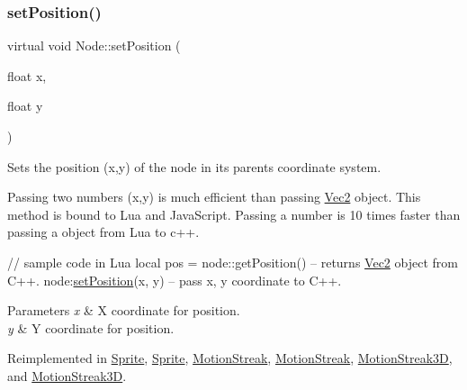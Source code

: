 \mbox{\label{classNode_aa23be53d56922c9ee20ff63ec296a1f7}} 
\subsubsection{\texorpdfstring{set\+Position()}{setPosition()}\hspace{0.1cm}{\footnotesize\ttfamily [4/4]}}
{\footnotesize\ttfamily virtual void Node\+::set\+Position (\begin{DoxyParamCaption}\item[{float}]{x,  }\item[{float}]{y }\end{DoxyParamCaption})\hspace{0.3cm}{\ttfamily [virtual]}}

Sets the position (x,y) of the node in its parent\textquotesingle{}s coordinate system.

Passing two numbers (x,y) is much efficient than passing \hyperlink{classVec2}{Vec2} object. This method is bound to Lua and Java\+Script. Passing a number is 10 times faster than passing a object from Lua to c++.


\begin{DoxyCode}
\textcolor{comment}{// sample code in Lua}
local pos  = node::getPosition()  -- returns \hyperlink{classVec2}{Vec2} \textcolor{keywordtype}{object} from C++.
node:\hyperlink{classNode_a8ffbf25763ef5f15eeae7227779505bc}{setPosition}(x, y)            -- pass x, y coordinate to C++.
\end{DoxyCode}



\begin{DoxyParams}{Parameters}
{\em x} & X coordinate for position. \\
\hline
{\em y} & Y coordinate for position. \\
\hline
\end{DoxyParams}


Reimplemented in \hyperlink{classSprite_aaef708324799384499b67c1721ad36d1}{Sprite}, \hyperlink{classSprite_ad6ceb4be9c4664798908bb0f8dd3bf70}{Sprite}, \hyperlink{classMotionStreak_a5aee78ffa74f687a09d9167b8da6d075}{Motion\+Streak}, \hyperlink{classMotionStreak_a8799ee17a6842cad944b85d67f1155d0}{Motion\+Streak}, \hyperlink{classMotionStreak3D_af19878b923b0caae1704f93a9ee21699}{Motion\+Streak3D}, and \hyperlink{classMotionStreak3D_ada67cecb8a81f0f48615d24eb9fc2373}{Motion\+Streak3D}.

